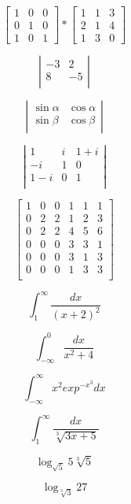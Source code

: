 \documentclass[a4paper]{article}
\begin{document}
\begin{center}
$$
\begin{bmatrix}
1 & 0 & 0 \\ 
0 & 1 & 0\\ 
1 & 0 & 1 
\end{bmatrix}
*
\begin{bmatrix}
1 & 1 & 3 \\ 
2 & 1 & 4\\ 
1 & 3 & 0 
\end{bmatrix}
$$

$$
\left|
\begin{array}{rr}
 -3 & 2\\ 
 8 & -5 \\
\end{array}
\right|
$$

$$
\left|
\begin{array}{rr}
 \sin \alpha & \cos \alpha \\ 
 \sin \beta & \cos \beta \\
\end{array}
\right|
$$


$$
\left|
\begin{array}{ccc}
 1 & i & 1+i \\ 
 -i  & 1 & 0\\
 1-i & 0 & 1 \\
\end{array}
\right|
$$



$$
\left[
\begin{array}{c|cc|ccc}
 1  & 0 & 0 & 1 & 1 & 1 \\ 
 \hline 
 0 & 2 & 2 & 1 & 2 & 3 \\
 0 & 2 & 2 & 4 & 5 & 6 \\
 \hline
 0 & 0 & 0 & 3 & 3 & 1 \\
 0 & 0 & 0 & 3 & 1 & 3 \\
 0  & 0 & 0 & 1 & 3 & 3 \\
\end{array}
\right]
$$



$$
\int_{1}^{\infty} \frac{dx}{(x+2)^2}
$$

$$
\int_{-\infty}^{0} \frac{dx}{x^2 + 4}
$$


$$
\int_{-\infty}^{\infty} x^2 exp^{-x^3} dx
$$


$$
\int_{1}^{\infty} \frac{dx}{\sqrt[3]{3x + 5}}
$$

$$
\log_{\sqrt{5}} 5\sqrt[3]{5}
$$

$$
\log_{\sqrt[3]{3}} 27
$$


\end{center}
\end{document}
